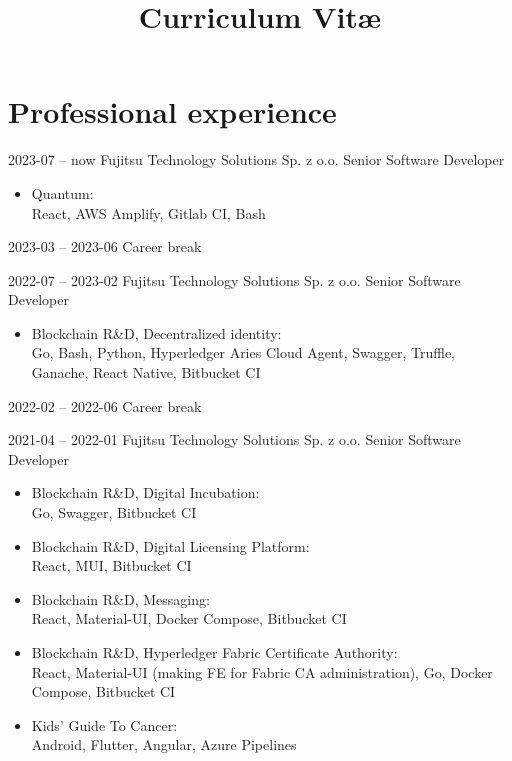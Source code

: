 \documentclass[11pt,a4paper,sans,english]{moderncv}   %
\title{Curriculum Vit\ae{}}
\begin{document}
\makecvtitle

\vspace{-1.6cm}

\section{Professional experience}

\cventry
{\small2023-07 -- now}
	{Fujitsu Technology Solutions Sp. z o.o.}{}{}
	{Senior Software Developer}
	{\begin{itemize}
		\item Quantum: \\
			React, AWS Amplify, Gitlab CI, Bash
	\end{itemize}}

\cventry
{\small2023-03 -- 2023-06}
	{Career break}{}{}{}{}

\cventry
{\small2022-07 -- 2023-02}
	{Fujitsu Technology Solutions Sp. z o.o.}{}{}
	{Senior Software Developer}
	{\begin{itemize}
		\item Blockchain R\&D, Decentralized identity: \\
			 Go, Bash, Python, Hyperledger Aries Cloud Agent, Swagger, Truffle,
			 Ganache, React Native, Bitbucket CI
	\end{itemize}}

\cventry
{\small2022-02 -- 2022-06}
	{Career break}{}{}{}{}

\cventry
{\small2021-04 -- 2022-01}
	{Fujitsu Technology Solutions Sp. z o.o.}{}{}
	{Senior Software Developer}
	{\begin{itemize}
		\item Blockchain R\&D, Digital Incubation: \\
			Go, Swagger, Bitbucket CI
		\item Blockchain R\&D, Digital Licensing Platform: \\
			React, MUI, Bitbucket CI
		\item Blockchain R\&D, Messaging: \\
			React, Material-UI, Docker Compose, Bitbucket CI
		\item Blockchain R\&D, Hyperledger Fabric Certificate Authority: \\
			React, Material-UI (making FE for Fabric CA administration), Go,
			Docker Compose, Bitbucket CI
		\item Kids' Guide To Cancer: \\
			Android, Flutter, Angular, Azure Pipelines
	\end{itemize}}
\end{document}

